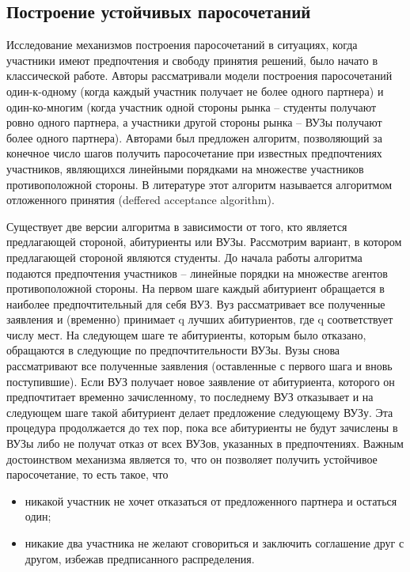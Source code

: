 \subsection{Построение устойчивых паросочетаний}

Исследование механизмов построения паросочетаний в ситуациях, когда участники имеют предпочтения и свободу принятия решений, было начато в классической работе\cite{gale}. Авторы рассматривали модели построения паросочетаний один-к-одному (когда каждый участник получает не более одного партнера) и один-ко-многим (когда участник одной стороны рынка – студенты получают ровно одного партнера, а
участники другой стороны рынка – ВУЗы получают более одного
партнера). Авторами был предложен алгоритм, позволяющий за конечное число шагов получить паросочетание при известных предпочтениях
участников, являющихся линейными порядками на множестве участников противоположной стороны. В литературе этот алгоритм называется алгоритмом отложенного принятия (deffered acceptance algorithm).

Существует две версии алгоритма в зависимости от того, кто является
предлагающей стороной, абитуриенты или ВУЗы.
Рассмотрим вариант, в котором предлагающей стороной являются студенты. До начала работы алгоритма подаются предпочтения участников – линейные порядки на множестве агентов противоположной стороны.
На первом шаге каждый абитуриент обращается в наиболее предпочтительный для себя ВУЗ. Вуз рассматривает все полученные заявления и
(временно) принимает q лучших абитуриентов, где q соответствует числу мест. На следующем шаге те абитуриенты, которым было отказано,
обращаются в следующие по предпочтительности ВУЗы. Вузы снова
рассматривают все полученные заявления (оставленные с первого шага
и вновь поступившие). Если ВУЗ получает новое заявление от абитуриента, которого он предпочтитает временно зачисленному, то последнему
ВУЗ отказывает и на следующем шаге такой абитуриент делает предложение следующему ВУЗу. Эта процедура продолжается до тех пор,
пока все абитуриенты не будут зачислены в ВУЗы либо не получат отказ от всех ВУЗов, указанных в предпочтениях.
Важным достоинством механизма является то, что он позволяет получить устойчивое паросочетание, то есть такое, что

\begin{itemize}[leftmargin=1.6\parindent]
	\item никакой участник не хочет отказаться от предложенного партнера и остаться один;
	\item никакие два участника не желают сговориться и заключить соглашение 
друг с другом, избежав предписанного распределения.
\end{itemize}

